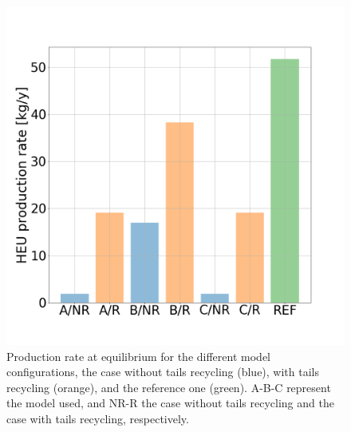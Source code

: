 \begin{figure}[h!] %
    \centering
    \includegraphics[scale=0.25]{HEU_prod_rate}
    \caption{Production rate at equilibrium for the different model
        configurations, the case without tails recycling (blue), with tails
        recycling (orange), and the reference one (green). A-B-C represent
        the model used, and NR-R the case without tails recycling and the case
        with tails recycling, respectively.}
    \label{fig:HEU_rate}
\end{figure}
